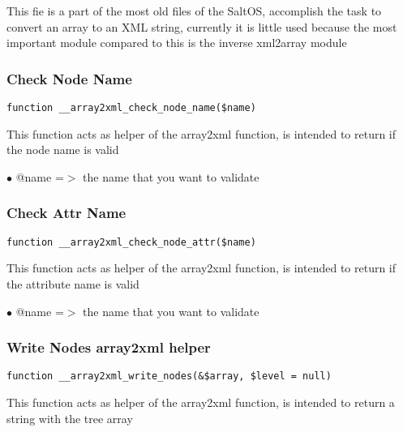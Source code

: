 \documentclass[a4paper]{article}
\begin{document}
This fie is a part of the most old files of the SaltOS, accomplish the task to convert an array
to an XML string, currently it is little used because the most important module compared to this
is the inverse xml2array module

\hypertarget{toc369}{}
\subsubsection{Check Node Name}

\begin{lstlisting}
function __array2xml_check_node_name($name)
\end{lstlisting}

This function acts as helper of the array2xml function, is intended to
return if the node name is valid

\begin{compactitem}
\item[\color{myblue}$\bullet$] @name =$>$ the name that you want to validate
\end{compactitem}

\hypertarget{toc370}{}
\subsubsection{Check Attr Name}

\begin{lstlisting}
function __array2xml_check_node_attr($name)
\end{lstlisting}

This function acts as helper of the array2xml function, is intended to
return if the attribute name is valid

\begin{compactitem}
\item[\color{myblue}$\bullet$] @name =$>$ the name that you want to validate
\end{compactitem}

\hypertarget{toc371}{}
\subsubsection{Write Nodes array2xml helper}

\begin{lstlisting}
function __array2xml_write_nodes(&$array, $level = null)
\end{lstlisting}

This function acts as helper of the array2xml function, is intended to
return a string with the tree array
\end{document}
